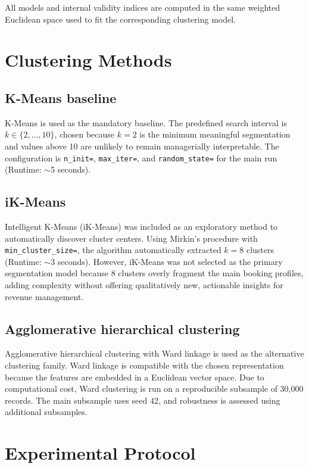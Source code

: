 \documentclass[11pt,a4paper]{article}
\begin{document}
All models and internal validity indices are computed in the same weighted Euclidean space used to fit the corresponding clustering model.

\section{Clustering Methods}

\subsection{K-Means baseline}
K-Means is used as the mandatory baseline. The predefined search interval is $k \in \{2,\ldots,10\}$, chosen because $k=2$ is the minimum meaningful segmentation and values above 10 are unlikely to remain managerially interpretable. The configuration is \texttt{n\_init=}, \texttt{max\_iter=}, and \texttt{random\_state=} for the main run (Runtime: $\sim$5 seconds).

\subsection{iK-Means}
Intelligent K-Means (iK-Means) was included as an exploratory method to automatically discover cluster centers. Using Mirkin's procedure with \texttt{min\_cluster\_size=}, the algorithm automatically extracted $k=8$ clusters (Runtime: $\sim$3 seconds). However, iK-Means was not selected as the primary segmentation model because 8 clusters overly fragment the main booking profiles, adding complexity without offering qualitatively new, actionable insights for revenue management.

\subsection{Agglomerative hierarchical clustering}
Agglomerative hierarchical clustering with Ward linkage is used as the alternative clustering family. Ward linkage is compatible with the chosen representation because the features are embedded in a Euclidean vector space. Due to computational cost, Ward clustering is run on a reproducible subsample of 30,000 records. The main subsample uses seed 42, and robustness is assessed using additional subsamples.
\section{Experimental Protocol}
\end{document}
